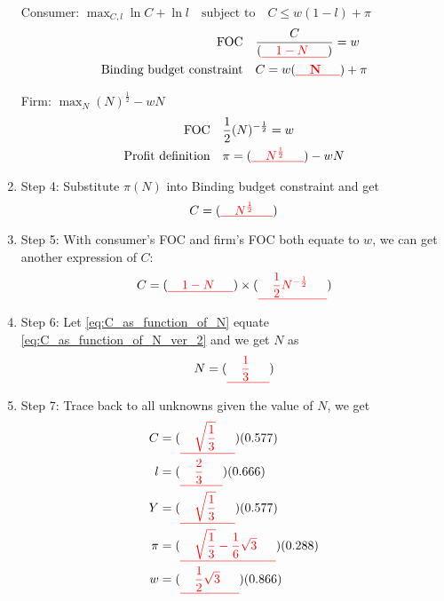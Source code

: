 \documentclass[14pt]{extarticle}
\newcommand{\red}[1]{\textcolor{red}{#1}}
\begin{document}
\begin{enumerate}
    Consumer: $ \max_{C, l} \ln C + \ln l \quad \text{subject to} \quad C \le w( 1-l ) + \pi $
    \begin{align}
        \text{FOC} \quad
            & \frac{C}{(\textbf{\red{\underline{\quad $1-N$ \quad}}})} = w
            \label{eq:consumerFOC}
        \\
        \text{Binding budget constraint} \quad
            & C = w (\textbf{\red{\underline{\quad N \quad}}}) + \pi
            \label{eq:binding_budget}
    \end{align}

    Firm: $ \max_{N} ( N )^{\frac{1}{2}} - w N $
    \begin{align}
        \text{FOC} \quad
            & \frac{1}{2} ( N )^{- \frac{1}{2}} = w
            \label{eq:firmFOC}
        \\
        \text{Profit definition} \quad
            & \pi = (\textbf{\red{\underline{\quad $N^{\frac{1}{2}}$ \quad}}}) - w N
            \label{eq:profitDef}
    \end{align}
    \item Step 4: Substitute $ \pi( N ) $ into Binding budget constraint and get
    \begin{equation}
    \label{eq:C_as_function_of_N}
        C = (\textbf{\red{\underline{\quad $N^{\frac{1}{2}}$ \quad}}})
    \end{equation}
    \item Step 5: With consumer's FOC and firm's FOC both equate to $ w $, we can get another expression of $ C $:
    \begin{equation}
    \label{eq:C_as_function_of_N_ver_2}
        C = (\textbf{\red{\underline{\quad $1-N$ \quad}}}) \times  (\textbf{\red{\underline{\quad $\frac{1}{2} N^{-\frac{1}{2}}$ \quad}}})
    \end{equation}
    \item Step 6: Let \eqref{eq:C_as_function_of_N} equate \eqref{eq:C_as_function_of_N_ver_2} and we get $ N $ as
    \begin{equation}
    \label{eq:Nvalue}
        N = (\textbf{\red{\underline{\quad $\frac{1}{3}$ \quad}}})
    \end{equation}
    \item Step 7: Trace back to all unknowns given the value of $ N $, we get
    \begin{align}
        C
            & = (\textbf{\red{\underline{\quad $\sqrt{ \frac{1}{3}} $ \quad}}}) (0.577)
        \\
        l
            & = (\textbf{\red{\underline{\quad $\frac{2}{3} $ \quad}}}) (0.666)
        \\
        Y
            & = (\textbf{\red{\underline{\quad $ \sqrt{ \frac{1}{3}}  $ \quad}}}) (0.577)
        \\
        \pi
            & = (\textbf{\red{\underline{\quad $\sqrt{\frac{1}{3}} - \frac{1}{6} \sqrt{3} $ \quad}}}) (0.288)
        \\
        w
            & = (\textbf{\red{\underline{\quad $\frac{1}{2} \sqrt{3} $ \quad}}}) (0.866)
    \end{align}


\end{enumerate}
\end{document}

